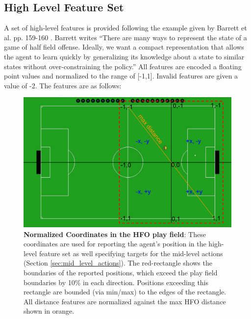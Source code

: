 \documentclass[12pt]{article}
\begin{document}
\subsection{High Level Feature Set}
A set of high-level features is provided following the example given
by Barrett et al. pp. 159-160 \cite{THESIS14-Barrett}. Barrett writes
``There are many ways to represent the state of a game of half field
offense.  Ideally, we want a compact representation that allows the
agent to learn quickly by generalizing its knowledge about a state to
similar states without over-constraining the policy.'' All features
are encoded a floating point values and normalized to the range of
[-1,1]. Invalid features are given a value of -2. The features are as
follows:

\begin{figure}[htp]
  \centering
  \includegraphics[width=.7\textwidth]{figures/playfieldCoords}
  \caption{\textbf{Normalized Coordinates in the HFO play field}:
    These coordinates are used for reporting the agent's position in
    the high-level feature set as well specifying targets for the
    mid-level actions (Section \ref{sec:mid_level_actions}). The
    red-rectangle shows the boundaries of the reported positions,
    which exceed the play field boundaries by 10\% in each
    direction. Positions exceeding this rectangle are bounded (via
    min/max) to the edges of the rectangle. All distance features are
    normalized against the max HFO distance shown in orange.}
  \label{fig:playfieldCoords}
\end{figure}
\end{document}
